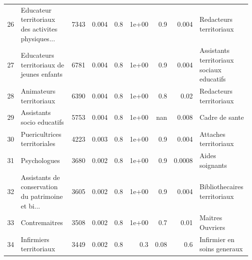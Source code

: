 \documentclass[11pt,a4paper]{article}
\begin{document}
\begin{tabular}{llrrrrrrl}
	26  &  Educateur territoriaux des activites physiques... &           7343 &          0.004 &                    0.8 &              1e+00 &                               0.9 &                                    0.004 &                            Redacteurs territoriaux \\
	27  &          Educateurs territoriaux de jeunes enfants &           6781 &          0.004 &                    0.8 &              1e+00 &                               0.9 &                                    0.004 &          Assistants territoriaux sociaux educatifs \\
	28  &                            Animateurs territoriaux &           6390 &          0.004 &                    0.8 &              1e+00 &                               0.8 &                                     0.02 &                            Redacteurs territoriaux \\
	29  &                         Assistants socio educatifs &           5753 &          0.004 &                    0.8 &              1e+00 &                               nan &                                    0.008 &                                     Cadre de sante \\
	30  &                       Puericultrices territoriales &           4223 &          0.003 &                    0.8 &              1e+00 &                               0.9 &                                    0.004 &                              Attaches territoriaux \\
	31  &                                       Psychologues &           3680 &          0.002 &                    0.8 &              1e+00 &                               0.9 &                                   0.0008 &                                    Aides soignants \\
	32  &  Assistants de conservation du patrimoine et bi... &           3605 &          0.002 &                    0.8 &              1e+00 &                               0.9 &                                    0.004 &                       Bibliothecaires territoriaux \\
	33  &                                      Contremaitres &           3508 &          0.002 &                    0.8 &              1e+00 &                               0.7 &                                     0.01 &                                   Maitres Ouvriers \\
	34  &                            Infirmiers territoriaux &           3449 &          0.002 &                    0.8 &                0.3 &                              0.08 &                                      0.6 &                        Infirmier en soins generaux \\

\end{tabular}
\end{document}
